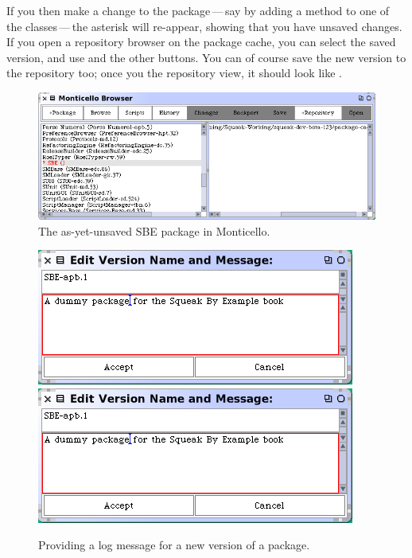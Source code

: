 \documentclass[a4paper,10pt,twoside]{book}
\begin{document}
If you then make a change to the package\,---\,say by adding a method to one of the classes\,---\,the asterisk will re-appear, showing that you have unsaved changes.  If you open a repository browser on the package cache, you can select the saved version, and use  and the other buttons.  
You can of course save the new version to the repository too; once you  the repository view, it should look like .

\begin{figure}[tbp]
	\begin{center}
		\includegraphics[width=\textwidth]{MC+SBE}
	\end{center}
	\caption{The as-yet-unsaved SBE package in Monticello.}
	\label{fig:MC+SBE}
\end{figure}

\begin{figure}[tbp]
	\begin{center}
	\ifluluelse
		{\includegraphics[scale=0.65]{SBE-apb}}
		{\includegraphics[scale=0.7]{SBE-apb}}
	\end{center}
	\caption{Providing a log message for a new version of a package.}
	\label{fig:SBE-apb}
\end{figure}
\end{document}
